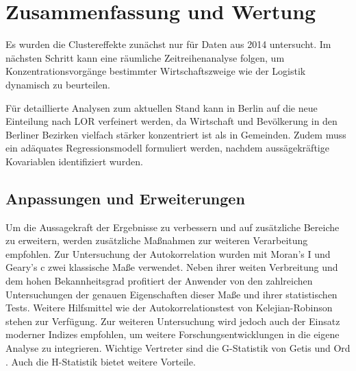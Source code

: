 \chapter{Zusammenfassung und Wertung}\label{ch:summary}


Es wurden die Clustereffekte zunächst nur für Daten aus 2014 untersucht. 
Im nächsten Schritt kann eine räumliche Zeitreihenanalyse folgen, 
um Konzentrationsvorgänge bestimmter Wirtschaftszweige wie der Logistik dynamisch zu beurteilen.


Für detaillierte Analysen zum aktuellen Stand kann in Berlin auf die neue Einteilung nach LOR verfeinert werden, 
da Wirtschaft und Bevölkerung in den Berliner Bezirken vielfach stärker konzentriert ist als in Gemeinden.
Zudem muss ein adäquates Regressionsmodell formuliert werden, nachdem aussägekräftige Kovariablen identifiziert wurden.

\section{Anpassungen und Erweiterungen}

Um die Aussagekraft der Ergebnisse zu verbessern und auf zusätzliche Bereiche zu erweitern, 
werden zusätzliche Maßnahmen zur weiteren Verarbeitung empfohlen. Zur Untersuchung der Autokorrelation wurden mit Moran’s I und Geary’s c zwei klassische Maße verwendet.
Neben ihrer weiten Verbreitung und dem hohen Bekannheitsgrad profitiert der Anwender von den zahlreichen 
Untersuchungen der genauen Eigenschaften dieser Maße und ihrer statistischen Tests. 
Weitere Hilfsmittel wie der Autokorrelationstest von Kelejian-Robinson stehen zur Verfügung. 
Zur weiteren Untersuchung wird jedoch auch der Einsatz moderner Indizes empfohlen, um 
weitere Forschungsentwicklungen in die eigene Analyse zu integrieren. Wichtige Vertreter sind die G-Statistik von Getis und Ord \cite[Kapitel 10]{anselin_perspectives_2010}.
Auch die H-Statistik bietet weitere Vorteile.



